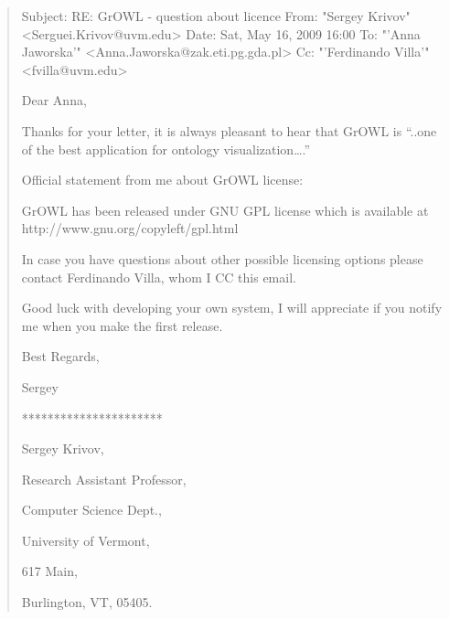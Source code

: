 \documentclass[a4paper,10pt]{article}
\begin{document}
\begin{quote}
 Subject:   	RE: GrOWL - question about licence
From:   	"Sergey Krivov" <Serguei.Krivov@uvm.edu>
Date:   	Sat, May 16, 2009 16:00
To:   	"'Anna Jaworska'" <Anna.Jaworska@zak.eti.pg.gda.pl>
Cc:   	"'Ferdinando Villa'" <fvilla@uvm.edu>

Dear Anna,

Thanks for your letter, it is always pleasant to hear that GrOWL is “..one of the
best application for ontology visualization….”



Official statement from me about GrOWL license:



GrOWL has been released under GNU GPL license   which is available at
http://www.gnu.org/copyleft/gpl.html



In case you have  questions about other possible licensing options please contact
Ferdinando Villa, whom I CC this email.



Good luck with developing your own system,  I will appreciate if you notify me when
you make the first release.



Best Regards,

Sergey

**********************

Sergey Krivov,

Research Assistant Professor,

Computer Science Dept.,

University of Vermont,

617 Main,

Burlington, VT, 05405.



\end{quote}
\end{document}
